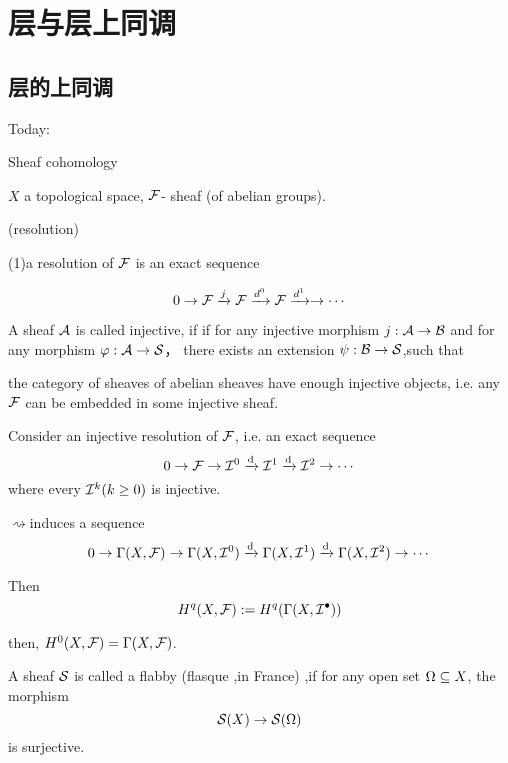 
\chapter{层与层上同调}
\section{层的上同调}
Today:

Sheaf cohomology

$X$ a topological space, $\mathcal{F}$- sheaf (of abelian groups).

\begin{definition}  (resolution)

(1)a resolution of $\mathcal{F}$ is an exact sequence

$$0\to \mathcal{F}\xrightarrow{j}\mathcal{F}\xrightarrow{d^0}\mathcal{F}\xrightarrow{d^1}\to\cdots$$

\end{definition}

\begin{definition}
A sheaf $\mathcal{A}$ is called injective, if
if for any injective morphism $j:\mathcal{A}\to \mathcal{B}$
and for any morphism $\varphi:\mathcal{A}\to\mathcal{S}$，
there exists an extension $\psi :\mathcal{B}\to \mathcal{S}$,such that
\end{definition}
\begin{thm}
the category of sheaves of abelian sheaves have enough
injective objects, i.e.  any $\mathcal{F}$ can be
embedded in some injective sheaf.
\end{thm}

\begin{definition}
Consider an injective resolution of $\mathcal{F}$, i.e. an exact sequence
$$0\to\mathcal{F}\to\mathcal{I}^0\xrightarrow{\mathrm{d}}\mathcal{I}^1\xrightarrow{\mathrm{d}}\mathcal{I}^2\to\cdots$$
where every $\mathcal{I}^k(k\geq 0)$ is injective.


$\rightsquigarrow $induces a sequence
$$0\to\Gamma(X,\mathcal{F})
\to\Gamma(X,\mathcal{I}^0)\xrightarrow{\mathrm{d}}
\Gamma(X,\mathcal{I}^1)\xrightarrow{\mathrm{d}}
\Gamma(X,\mathcal{I}^2)\to\cdots$$

Then
$$H^q(X,\mathcal{F}):=H^q(\Gamma(X,\mathcal{I}^{\bullet}))$$

\end{definition}

then, $H^0(X,\mathcal{F})=\Gamma(X,\mathcal{F})$.

\begin{definition}
A sheaf $\mathcal{S}$ is called a flabby (flasque ,in France) ,if
for any open set $\Omega\subseteq X$, the morphism
$$\mathcal{S}(X)\to\mathcal{S}(\Omega)$$
is surjective.
\end{definition}

